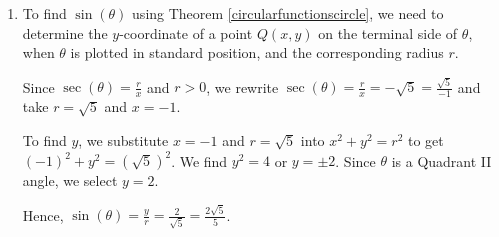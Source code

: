 \documentclass{ximera}
\begin{document}
\begin{example}
\begin{explanation}
\begin{enumerate}
\begin{image}
\end{image}




\item To find $\sin(\theta)$ using Theorem \ref{circularfunctionscircle}, we need to determine the $y$-coordinate of a point $Q(x,y)$ on the terminal side of $\theta$, when $\theta$ is plotted in standard position,  and the corresponding radius $r$. 



Since   $\sec(\theta) = \frac{r}{x}$ and $r > 0$, we rewrite  $\sec(\theta) = \frac{r}{x}  = -\sqrt{5} = \frac{\sqrt{5}}{-1}$ and take $r = \sqrt{5}$ and $x = -1$.



To find $y$, we substitute $x=-1$ and $r=\sqrt{5}$ into $x^2+y^2 = r^2$ to get $(-1)^2+y^2=(\sqrt{5})^2$.  We find $y^2 = 4$ or $y = \pm 2$.   Since $\theta$ is a Quadrant II angle, we select $y = 2$.



Hence, $\sin(\theta) = \frac{y}{r} = \frac{2}{\sqrt{5}} = \frac{2 \sqrt{5}}{5}$.

\begin{image}
\end{image}
\end{enumerate}
\end{explanation}
\end{example}
\end{document}
